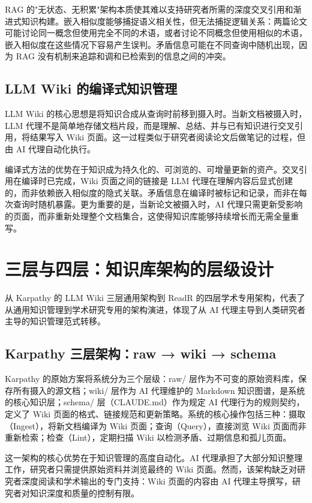 \documentclass[11pt, a4paper, nonumbering]{SciMasterNoBrand}
\begin{document}
RAG 的"无状态、无积累"架构本质使其难以支持研究者所需的深度交叉引用和渐进式知识构建。嵌入相似度能够捕捉语义相关性，但无法捕捉逻辑关系：两篇论文可能讨论同一概念但使用完全不同的术语，或者讨论不同概念但使用相似的术语，嵌入相似度在这些情况下容易产生误判\cite{aditividyarthi2026}。矛盾信息可能在不同查询中随机出现，因为 RAG 没有机制来追踪和调和已检索到的信息之间的冲突。

\subsection{LLM Wiki 的编译式知识管理}

LLM Wiki 的核心思想是将知识合成从查询时前移到摄入时。当新文档被摄入时，LLM 代理不是简单地存储文档片段，而是理解、总结、并与已有知识进行交叉引用，将结果写入 Wiki 页面\cite{karpathy2026llmwiki}。这一过程类似于研究者阅读论文后做笔记的过程，但由 AI 代理自动化执行。

编译式方法的优势在于知识成为持久化的、可浏览的、可增量更新的资产。交叉引用在编译时已完成，Wiki 页面之间的链接是 LLM 代理在理解内容后显式创建的，而非依赖嵌入相似度的隐式关联。矛盾信息在编译时被标记和记录，而非在每次查询时随机暴露。更为重要的是，当新论文被摄入时，AI 代理只需更新受影响的页面，而非重新处理整个文档集合，这使得知识库能够持续增长而无需全量重写。

\section{三层与四层：知识库架构的层级设计}

从 Karpathy 的 LLM Wiki 三层通用架构到 ReadR 的四层学术专用架构，代表了从通用知识管理到学术研究专用的架构演进，体现了从 AI 代理主导到人类研究者主导的知识管理范式转移。

\subsection{Karpathy 三层架构：raw → wiki → schema}

Karpathy 的原始方案将系统分为三个层级：raw/ 层作为不可变的原始资料库，保存所有摄入的源文档；wiki/ 层作为 AI 代理维护的 Markdown 知识图谱，是系统的核心知识层；schema/ 层（CLAUDE.md）作为规定 AI 代理行为的规则契约，定义了 Wiki 页面的格式、链接规范和更新策略\cite{karpathy2026llmwiki}。系统的核心操作包括三种：摄取（Ingest），将新文档编译为 Wiki 页面；查询（Query），直接浏览 Wiki 页面而非重新检索；检查（Lint），定期扫描 Wiki 以检测矛盾、过期信息和孤儿页面。

这一架构的核心优势在于知识管理的高度自动化。AI 代理承担了大部分知识整理工作，研究者只需提供原始资料并浏览最终的 Wiki 页面。然而，该架构缺乏对研究者深度阅读和学术输出的专门支持：Wiki 页面的内容由 AI 代理主导撰写，研究者对知识深度和质量的控制有限。
\end{document}
